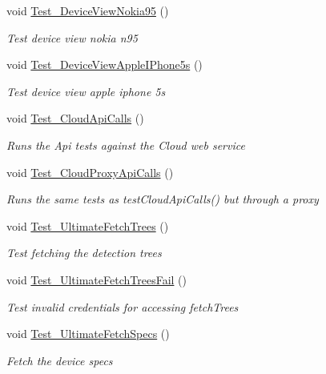 \begin{DoxyCompactItemize}
void \hyperlink{class_h_d3_test_1_1_h_d3_test_a9868b521ea0f0841b5b1b7b3e94d091e}{Test\+\_\+\+Device\+View\+Nokia95} ()
\begin{DoxyCompactList}\small\item\em Test device view nokia n95 \end{DoxyCompactList}\item 
void \hyperlink{class_h_d3_test_1_1_h_d3_test_a2b61778719c07edcac5530670a9bfe61}{Test\+\_\+\+Device\+View\+Apple\+I\+Phone5s} ()
\begin{DoxyCompactList}\small\item\em Test device view apple iphone 5s \end{DoxyCompactList}\item 
void \hyperlink{class_h_d3_test_1_1_h_d3_test_a0bae98356d9158fd50af3b3f5ebde50f}{Test\+\_\+\+Cloud\+Api\+Calls} ()
\begin{DoxyCompactList}\small\item\em Runs the Api tests against the Cloud web service \end{DoxyCompactList}\item 
void \hyperlink{class_h_d3_test_1_1_h_d3_test_ad5a01c5033304d942be016a52f646aa4}{Test\+\_\+\+Cloud\+Proxy\+Api\+Calls} ()
\begin{DoxyCompactList}\small\item\em Runs the same tests as test\+Cloud\+Api\+Calls() but through a proxy \end{DoxyCompactList}\item 
void \hyperlink{class_h_d3_test_1_1_h_d3_test_a00dc667c19910bac6c2205d42f541396}{Test\+\_\+\+Ultimate\+Fetch\+Trees} ()
\begin{DoxyCompactList}\small\item\em Test fetching the detection trees \end{DoxyCompactList}\item 
void \hyperlink{class_h_d3_test_1_1_h_d3_test_a1d65d21285c2f233b89fb44703e7da0c}{Test\+\_\+\+Ultimate\+Fetch\+Trees\+Fail} ()
\begin{DoxyCompactList}\small\item\em Test invalid credentials for accessing fetch\+Trees \end{DoxyCompactList}\item 
void \hyperlink{class_h_d3_test_1_1_h_d3_test_af96febf14793416b127d028df34f010f}{Test\+\_\+\+Ultimate\+Fetch\+Specs} ()
\begin{DoxyCompactList}\small\item\em Fetch the device specs \end{DoxyCompactList}\item 

\end{DoxyCompactItemize}
